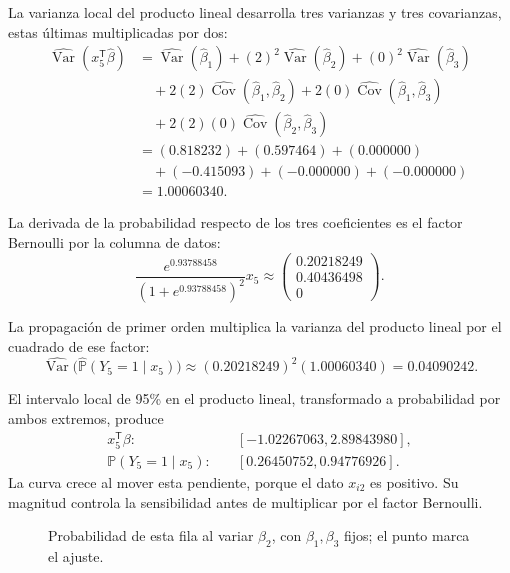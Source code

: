 \documentclass[11pt,a4paper]{article}
\newcommand{\Prob}{\mathbb P}
\newcommand{\T}{^{\mathsf T}}
\DeclareMathOperator{\Var}{Var}
\DeclareMathOperator{\Cov}{Cov}
\begin{document}
La varianza local del producto lineal desarrolla tres varianzas
y tres covarianzas, estas últimas multiplicadas por dos:
\[
\begin{aligned}
\widehat{\Var}(x_{5}\T\widehat\beta)&=\widehat{\Var}(\widehat\beta_1)+(2)^2\widehat{\Var}(\widehat\beta_2)+(0)^2\widehat{\Var}(\widehat\beta_3)\\&\quad+2(2)\widehat{\Cov}(\widehat\beta_1,\widehat\beta_2)+2(0)\widehat{\Cov}(\widehat\beta_1,\widehat\beta_3)\\&\quad+2(2)(0)\widehat{\Cov}(\widehat\beta_2,\widehat\beta_3)\\&=(0.818232)+(0.597464)+(0.000000)\\&\quad+(-0.415093)+(-0.000000)+(-0.000000)\\&=1.00060340.\end{aligned}
\]

La derivada de la probabilidad respecto de los tres coeficientes
es el factor Bernoulli por la columna de datos:
\[
\frac{e^{0.93788458}}{(1+e^{0.93788458})^2}x_{5}\approx\begin{pmatrix}0.20218249\\0.40436498\\0\end{pmatrix}.
\]

La propagación de primer orden multiplica la varianza del
producto lineal por el cuadrado de ese factor:
\[
\widehat{\Var}\bigl(\widehat{\Prob}(Y_{5}=1\mid x_{5})\bigr)\approx(0.20218249)^2(1.00060340)=0.04090242.
\]

El intervalo local de 95\% en el producto lineal,
transformado a probabilidad por ambos extremos, produce
\[
\begin{aligned}
x_{5}\T\beta:&\quad[-1.02267063,2.89843980],\\\Prob(Y_{5}=1\mid x_{5}):&\quad[0.26450752,0.94776926].\end{aligned}
\]
La curva crece al mover esta pendiente, porque el dato $x_{i2}$ es positivo. Su magnitud controla la sensibilidad antes de multiplicar por el factor Bernoulli.
\begin{figure}[H]\centering
{}
\caption{Probabilidad de esta fila al variar \(\beta_2\), con \(\beta_1,\beta_3\) fijos; el punto marca el ajuste.}
\end{figure}
\end{document}
